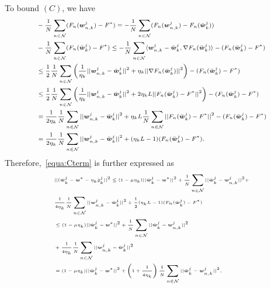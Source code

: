 To bound $(C)$, we have
\vspace{-5pt}
\begin{equation}\scriptsize
\begin{aligned}
&- \frac{1}{N} \sum_{n\in\mathcal{N}}(F_{n}(\boldsymbol{w}_{n,k}^j) - F^*)
= -\frac{1}{N} \sum_{n\in\mathcal{N}}(F_{n}(\boldsymbol{w}_{n,k}^j) - F_n(\bar{\boldsymbol{w}}_k^j)) 
\\&- \frac{1}{N} \sum_{n\in\mathcal{N}}(F_n(\bar{\boldsymbol{w}}_k^j) - F^*)
 \leq - \frac{1}{N} \sum_{n\in\mathcal{N}} \langle \boldsymbol{w}_{n,k}^j - \bar{\boldsymbol{w}}_k^j, \nabla F_n(\bar{\boldsymbol{w}}_k^j)\rangle - (F_{n}(\bar{\boldsymbol{w}}_k^j) - F^*)
\\& \leq  \frac{1}{2}\frac{1}{N} \sum_{n\in\mathcal{N}}\left(\frac{1}{\eta_k}||\boldsymbol{w}_{n,k}^j - \bar{\boldsymbol{w}}_k^j||^2 +\eta_k ||\nabla F_n(\bar{\boldsymbol{w}}_k^j)||^2 \right) - (F_{n}(\bar{\boldsymbol{w}}_k^j) - F^*)
\\& \leq  \frac{1}{2}\frac{1}{N} \sum_{n\in\mathcal{N}}\left(\frac{1}{\eta_k}||\boldsymbol{w}_{n,k}^j - \bar{\boldsymbol{w}}_k^j||^2 +2\eta_kL ||F_n(\bar{\boldsymbol{w}}_k^j) -F^*||^2 \right) - (F_{n}(\bar{\boldsymbol{w}}_k^j) - F^*)
\\& = \frac{1}{2\eta_k}\frac{1}{N} \sum_{n\in\mathcal{N}}||\boldsymbol{w}_{n,k}^j -  \bar{\boldsymbol{w}}_k^j||^2 + \eta_kL\frac{1}{N} \sum_{n\in\mathcal{N}}||F_n(\bar{\boldsymbol{w}}_k^j) -F^*||^2- (F_{n}(\bar{\boldsymbol{w}}_k^j) - F^*)
\\& =\frac{1}{2\eta_k}\frac{1}{N} \sum_{n\in\mathcal{N}}||\boldsymbol{w}_{n,k}^j -  \bar{\boldsymbol{w}}_k^j||^2 + (\eta_kL-1)(F_{n}(\bar{\boldsymbol{w}}_k^j) - F^*).
\end{aligned}
\end{equation}
Therefore,~\eqref{equa:Cterm}
is further expressed as
\begin{equation} \tiny
\begin{aligned}\label{equa:subsubC}
&||(\bar{\boldsymbol{w}}_k^j - \boldsymbol{w}^* -\eta_k\bar{g}_k^j||^2 \leq (1-\mu\eta_k)||\bar{\boldsymbol{w}}_k^j - \boldsymbol{w}^*||^2  + \frac{1}{N}\sum_{n\in\mathcal{N}}||\bar{\boldsymbol{w}}_k^j-\boldsymbol{w}_{n,k}^j||^2 + 
\\&\frac{1}{4\eta_k}\frac{1}{N} \sum_{n\in\mathcal{N}}||\boldsymbol{w}_{n,k}^j -  \bar{\boldsymbol{w}}_k^j||^2 + \frac{1}{2}(\eta_kL-1)(F_{n}(\bar{\boldsymbol{w}}_k^j) - F^*)
\\&\leq (1-\mu\eta_k)||\bar{\boldsymbol{w}}_k^j - \boldsymbol{w}^*||^2  + \frac{1}{N}\sum_{n\in\mathcal{N}}||\bar{\boldsymbol{w}}_k^j-\boldsymbol{w}_{n,k}^j||^2 
\\& + 
\frac{1}{4\eta_k}\frac{1}{N} \sum_{n\in\mathcal{N}}||\boldsymbol{w}_{n,k}^j -  \bar{\boldsymbol{w}}_k^j||^2
\\& = (1-\mu\eta_k)||\bar{\boldsymbol{w}}_k^j - \boldsymbol{w}^*||^2  + \left(1+\frac{1}{4\eta_k}\right) \frac{1}{N}\sum_{n\in\mathcal{N}}||\bar{\boldsymbol{w}}_k^j-\boldsymbol{w}_{n,k}^j||^2,
\end{aligned}
\end{equation}

